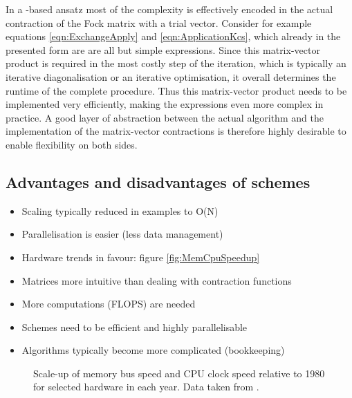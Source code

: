 In a \contraction-based ansatz most of the complexity is effectively
encoded in the actual contraction of the Fock matrix with a trial vector.
Consider for example equations \eqref{eqn:ExchangeApply}
and \eqref{eqn:ApplicationKcs},
which already in the presented form are are all but simple expressions.
Since this matrix-vector product is required in the most costly step
of the \SCF iteration,
which is typically an iterative diagonalisation or an iterative optimisation,
it overall determines the runtime of the complete procedure.
Thus this matrix-vector product needs to be implemented very efficiently,
making the expressions even more complex in practice.
A good layer of abstraction between the actual \SCF algorithm
and the implementation of the matrix-vector contractions
is therefore highly desirable to enable flexibility on both sides.



\subsection{Advantages and disadvantages of \contraction schemes}
\begin{itemize}
	\item Scaling typically reduced in examples to O(N)
	\item Parallelisation is easier (less data management)
	\item Hardware trends in favour: figure \vref{fig:MemCpuSpeedup}
	\item Matrices more intuitive than dealing with contraction functions
	\item More computations (FLOPS) are needed
	\item Schemes need to be efficient and highly parallelisable
	\item Algorithms typically become more complicated (bookkeeping)
\end{itemize}


\begin{figure}
	\centering
	\caption[Scale-up of memory bus speed and CPU clock speed]
	{Scale-up of memory bus speed and CPU clock speed
		relative to 1980 for selected hardware in each year.
		Data taken from \cite{Gocon2014}.}
	\label{fig:MemCpuSpeedup}
\end{figure}


